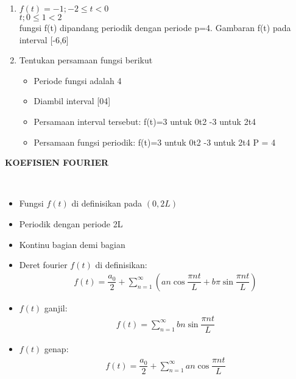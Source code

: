 \documentclass{article}
\begin{document}
\begin{enumerate}
    \item $f(t)= -1;-2 \le t < 0$\\
          $ t ; 0 \le 1 < 2$\\
          fungsi f(t) dipandang periodik dengan periode p=4. Gambaran f(t) pada interval [-6,6]
    \item Tentukan persamaan fungsi berikut
          \begin{itemize}
              \item Periode fungsi adalah 4
              \item Diambil interval [04]
              \item Persamaan interval tersebut:
                    f(t)=3 untuk 0t2
                    -3 untuk 2t4
              \item  Persamaan fungsi periodik:
                    f(t)=3 untuk 0t2
                    -3 untuk 2t4
                    P = 4
          \end{itemize}
\end{enumerate}



\newpage
\begin{center}
    \textbf{KOEFISIEN FOURIER}
\end{center}
\leavevmode\\
\begin{itemize}
    \item Fungsi $f(t)$ di definisikan pada $(0, 2L)$
    \item Periodik dengan periode 2L
    \item Kontinu bagian demi bagian
    \item Deret fourier $f(t)$ di definisikan:
          \begin{align}
              f(t) = \dfrac{a_0}{2} + \sum_{n = 1}^{\infty} (an \cos \dfrac{\pi nt}{L} + b\pi \sin \dfrac{\pi nt}{L})
              \nonumber
          \end{align}
    \item $f(t)$ ganjil:
          \begin{align}
              f(t) = \sum_{n = 1}^{\infty} bn \sin \dfrac{\pi nt}{L}
              \nonumber
          \end{align}
    \item $f(t)$ genap:
          \begin{align}
              f(t) = \dfrac{a_0}{2} + \sum_{n = 1}^{\infty} an \cos \dfrac{\pi nt}{L}
              \nonumber
          \end{align}
\end{itemize}
\end{document}
